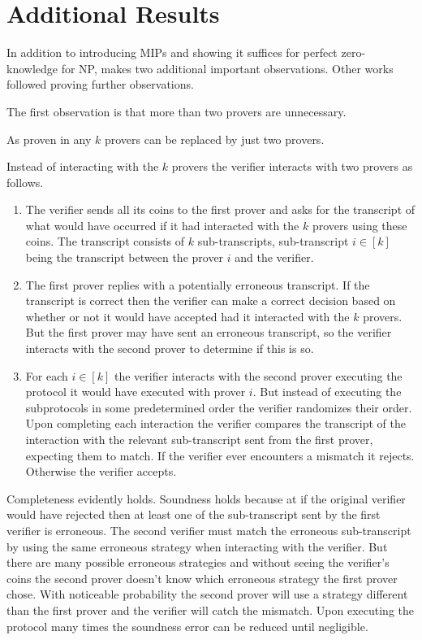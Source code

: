 \section{Additional Results}

In addition to introducing MIPs and showing it suffices for perfect zero-knowledge for NP, \cite{BGKW88} makes two additional important observations.
Other works followed proving further observations.

The first observation is that more than two provers are unnecessary.
\begin{theorem}
    As proven in \cite{BGKW88} any $k$ provers can be replaced by just two provers.

    \proof
    Instead of interacting with the $k$ provers the verifier interacts with two provers as follows.
    \begin{enumerate}
        \item
        The verifier sends all its coins to the first prover and asks for the transcript of what would have occurred if it had interacted with the $k$ provers using these coins.
        The transcript consists of $k$ sub-transcripts, sub-transcript $i\in[k]$ being the transcript between the prover $i$ and the verifier.
        \item
        The first prover replies with a potentially erroneous transcript.
        If the transcript is correct then the verifier can make a correct decision based on whether or not it would have accepted had it interacted with the $k$ provers.
        But the first prover may have sent an erroneous transcript, so the verifier interacts with the second prover to determine if this is so.
        \item
        For each $i\in[k]$ the verifier interacts with the second prover executing the protocol it would have executed with prover $i$.
        But instead of executing the subprotocols in some predetermined order the verifier randomizes their order.
        Upon completing each interaction the verifier compares the transcript of the interaction with the relevant sub-transcript sent from the first prover, expecting them to match.
        If the verifier ever encounters a mismatch it rejects.
        Otherwise the verifier accepts.
    \end{enumerate}
    Completeness evidently holds.
    Soundness holds because at if the original verifier would have rejected then at least one of the sub-transcript sent by the first verifier is erroneous.
    The second verifier must match the erroneous sub-transcript by using the same erroneous strategy when interacting with the verifier.
    But there are many possible erroneous strategies and without seeing the verifier's coins the second prover doesn't know which erroneous strategy the first prover chose.
    With noticeable probability the second prover will use a strategy different than the first prover and the verifier will catch the mismatch.
    Upon executing the protocol many times the soundness error can be reduced until negligible.
\end{theorem}

